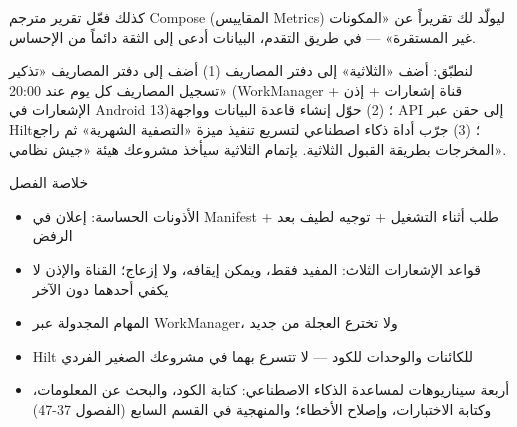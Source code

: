 كذلك فعّل تقرير مترجم Compose (المقاييس Metrics) ليولّد لك تقريراً عن «المكونات غير المستقرة» — في طريق التقدم، البيانات أدعى إلى الثقة دائماً من الإحساس.

\begin{tcbpractice}{لنطبّق: أضف «الثلاثية» إلى دفتر المصاريف}
(1) أضف إلى دفتر المصاريف «تذكير تسجيل المصاريف كل يوم عند 20:00» (WorkManager + قناة إشعارات + إذن الإشعارات في Android 13)؛ (2) حوّل إنشاء قاعدة البيانات وواجهة API إلى حقن عبر Hilt؛ (3) جرّب أداة ذكاء اصطناعي لتسريع تنفيذ ميزة «التصفية الشهرية» ثم راجع المخرجات بطريقة القبول الثلاثية. بإتمام الثلاثية سيأخذ مشروعك هيئة «جيش نظامي».

\end{tcbpractice}

\begin{tcbsummary}{خلاصة الفصل}
\begin{itemize}
  \item الأذونات الحساسة: إعلان في Manifest + طلب أثناء التشغيل + توجيه لطيف بعد الرفض
  \item قواعد الإشعارات الثلاث: المفيد فقط، ويمكن إيقافه، ولا إزعاج؛ القناة والإذن لا يكفي أحدهما دون الآخر
  \item المهام المجدولة عبر WorkManager، ولا تخترع العجلة من جديد
  \item Hilt للكائنات والوحدات للكود — لا تتسرع بهما في مشروعك الصغير الفردي
  \item أربعة سيناريوهات لمساعدة الذكاء الاصطناعي: كتابة الكود، والبحث عن المعلومات، وكتابة الاختبارات، وإصلاح الأخطاء؛ والمنهجية في القسم السابع (الفصول 37-47)
\end{itemize}

\end{tcbsummary}
